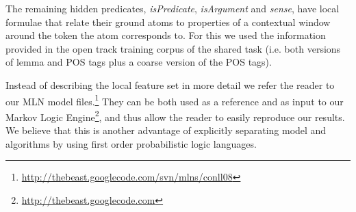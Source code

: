 The remaining hidden predicates, \emph{isPredicate}, \emph{isArgument} and \emph{sense}, have local formulae that relate their ground atoms to properties of a contextual window around the token the atom corresponds to. For this we used the information provided in the open track training corpus of the shared task (i.e. both versions of lemma and POS tags plus a coarse version of the POS tags). 

Instead of describing the local feature set in more detail we refer the reader to our MLN model files.\footnote{\url{http://thebeast.googlecode.com/svn/mlns/conll08}} They can be both used as a reference and as input to our Markov Logic Engine\footnote{\url{http://thebeast.googlecode.com}}, and thus allow the reader to easily reproduce our results. We believe that this is another advantage of explicitly separating model and algorithms by using first order probabilistic logic languages.







 



